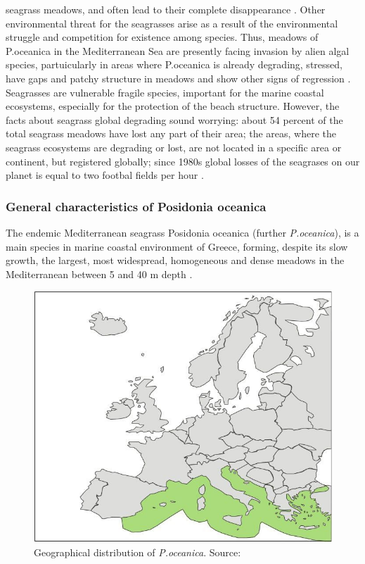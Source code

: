 \documentclass[10pt, a4paper]{article}
\begin{document}
seagrass meadows, and often lead to their complete disappearance \cite{Holmer09}\label{Holmer09}.
Other environmental threat for the seagrasses arise as a result of the environmental struggle and
competition for existence among species. Thus, meadows of P.oceanica in the Mediterranean Sea are
presently facing invasion by alien algal species, partuicularly in areas where P.oceanica is already
degrading, stressed, have gaps and patchy structure in meadows and show other signs of regression
\cite{Montefalcone10}\label{Montefalcone10}.
Seagrasses are vulnerable fragile species, important for the marine coastal ecosystems, especially for
the protection of the beach structure. However, the facts about seagrass global degrading sound
worrying: about 54 percent of the total seagrass meadows have lost any part of their area; the areas, where
the seagrass ecosystems are degrading or lost, are not located in a specific area or continent, but
registered globally; since 1980s global losses of the seagrases on our planet is equal to two footbal
fields per hour \cite{Mellors09b}\label{Mellors09b}.

\subsubsection{General characteristics of Posidonia oceanica}
The endemic Mediterranean seagrass Posidonia oceanica (further \textit{P.oceanica}), is a main species in
marine coastal environment of Greece, forming, despite its slow growth, the largest, most widespread,
homogeneous and dense meadows in the Mediterranean between 5 and 40 m depth \cite{DenHartog70}\label{DenHartog70}.

\begin{figure}
\centering
\includegraphics[scale=0.20]{Fig-1-5.jpg}
\caption{Geographical distribution of
\textit{P.oceanica}. Source: \cite{Borum04}\label{Borum04}}
\label{fig:5}
\end{figure}
\end{document}
